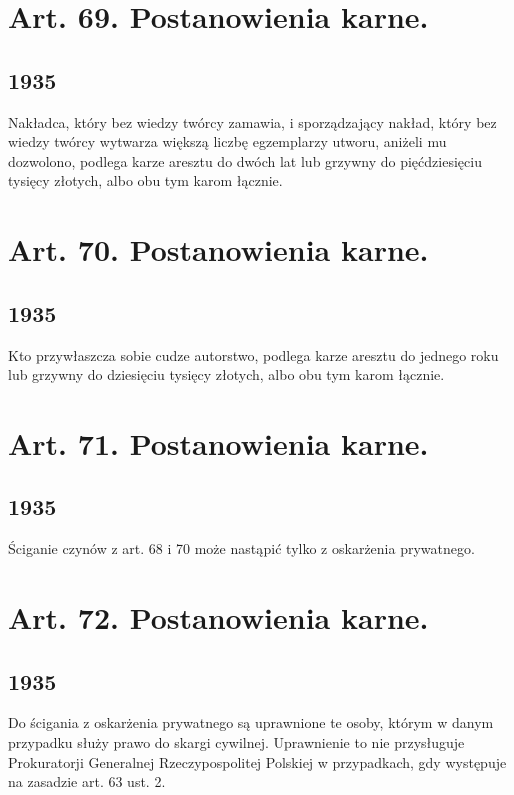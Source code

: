 \documentclass[withmarginpar]{book}
\begin{document}
\section{Art. 69. Postanowienia karne.}
\label{sec:art.-69}
\subsection{1935}
\label{sec:art.-69-1}

Nakładca, który bez wiedzy twórcy zamawia, i sporządzający nakład,
który bez wiedzy twórcy wytwarza większą liczbę egzemplarzy utworu,
aniżeli mu dozwolono, podlega karze aresztu do dwóch lat lub grzywny
do pięćdziesięciu tysięcy złotych, albo obu tym karom łącznie.

\section{Art. 70. Postanowienia karne.}
\label{sec:art.-70}
\subsection{1935}
\label{sec:art.-70-1}

Kto przywłaszcza sobie cudze autorstwo, podlega karze aresztu do
jednego roku lub grzywny do dziesięciu tysięcy złotych, albo obu tym
karom łącznie.

\section{Art. 71. Postanowienia karne.}
\label{sec:art.-71}
\subsection{1935}
\label{sec:art.-71-1}

Ściganie czynów z art. 68 i 70 może nastąpić tylko z oskarżenia
prywatnego.

\section{Art. 72. Postanowienia karne.}
\label{sec:art.-72}
\subsection{1935}
\label{sec:art.-72-1}

Do ścigania z oskarżenia prywatnego są uprawnione te osoby, którym w
danym przypadku służy prawo do skargi cywilnej. Uprawnienie to nie
przysługuje Prokuratorji Generalnej Rzeczypospolitej Polskiej w
przypadkach, gdy występuje na zasadzie art. 63 ust. 2.
\end{document}
